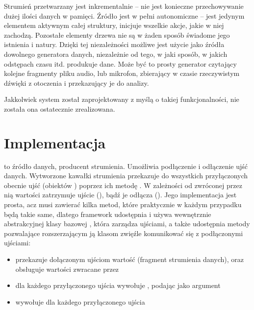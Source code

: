 Strumień przetwarzany jest inkrementalnie -- nie jest konieczne przechowywanie dużej ilości danych w
pamięci. Źródło jest w pełni autonomiczne -- jest jedynym elementem aktywnym całej struktury,
inicjuje wszelkie akcje, jakie w niej zachodzą. Pozostałe elementy drzewa nie są w żaden sposób
świadome jego istnienia i natury. Dzięki tej niezależności możliwe jest użycie jako źródła dowolnego
generatora danych, niezależnie od tego, w jaki sposób, w jakich odstępach czasu itd. produkuje dane.
Może być to prosty generator czytający kolejne fragmenty pliku audio, lub mikrofon, zbierający w
czasie rzeczywistym dźwięki z otoczenia i przekazujący je do analizy.

\begin{Note}
  Jakkolwiek system został zaprojektowany z myślą o takiej funkcjonalności, nie została ona
  ostatecznie zrealizowana.
\end{Note}


\section{Implementacja}


 to źródło danych, producent strumienia. Umożliwia podłączenie i odłączenie ujść
danych. Wytworzone kawałki strumienia przekazuje do wszystkich przyłączonych obecnie ujść (obiektów
) poprzez ich metodę . W zależności od zwróconej przez nią wartości
zatrzymuje ujście (), bądź je odłącza (). Jego implementacja jest
prosta, acz musi zawierać kilka metod, które praktycznie w każdym przypadku będą takie same, dlatego
framework udostępnia i używa wewnętrznie abstrakcyjnej klasy bazowej ,
która zarządza ujściami, a także udostępnia metody pozwalające rozszerzającym ją klasom zwięźle
komunikować się z podłączonymi ujściami:

\begin{itemize}

  \item {} przekazuje dołączonym ujściom wartość  (fragment
    strumienia danych), oraz obsługuje wartości zwracane przez 

  \item {} dla każdego przyłączonego ujścia wywołuje ,
    podając  jako argument

  \item {} wywołuje  dla każdego przyłączonego ujścia

\end{itemize}


